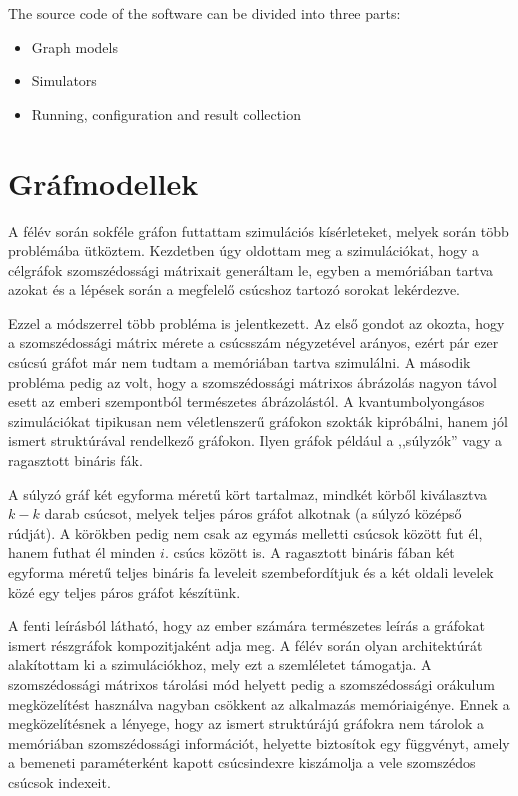 The source code of the software can be divided into three parts:

\begin{itemize}
    \item Graph models
    \item Simulators
    \item Running, configuration and result collection
\end{itemize}





\section{Gráfmodellek}

A félév során sokféle gráfon futtattam szimulációs kísérleteket, melyek során több problémába ütköztem. Kezdetben úgy oldottam meg a szimulációkat, hogy a célgráfok szomszédossági mátrixait generáltam le, egyben a memóriában tartva azokat és a lépések során a megfelelő csúcshoz tartozó sorokat lekérdezve.

Ezzel a módszerrel több probléma is jelentkezett. Az első gondot az okozta, hogy a szomszédossági mátrix mérete a csúcsszám négyzetével arányos, ezért pár ezer csúcsú gráfot már nem tudtam a memóriában tartva szimulálni. A második probléma pedig az volt, hogy a szomszédossági mátrixos ábrázolás nagyon távol esett az emberi szempontból természetes ábrázolástól. A kvantumbolyongásos szimulációkat tipikusan nem véletlenszerű gráfokon szokták kipróbálni, hanem jól ismert struktúrával rendelkező gráfokon. Ilyen gráfok például a ,,súlyzók''
vagy a ragasztott bináris fák.

A súlyzó gráf két egyforma méretű kört tartalmaz, mindkét körből kiválasztva $k - k$ darab csúcsot, melyek teljes páros gráfot alkotnak (a súlyzó középső rúdját). A körökben pedig nem csak az egymás melletti csúcsok között fut él, hanem futhat él minden $i.$ csúcs között is. A ragasztott bináris fában két egyforma méretű teljes bináris fa leveleit szembefordítjuk és a két oldali levelek közé egy teljes páros gráfot készítünk.

A fenti leírásból látható, hogy az ember számára természetes leírás a gráfokat ismert részgráfok kompozitjaként adja meg. A félév során olyan architektúrát alakítottam ki a szimulációkhoz, mely ezt a szemléletet támogatja. A szomszédossági mátrixos tárolási mód helyett pedig a szomszédossági orákulum megközelítést használva nagyban csökkent az alkalmazás memóriaigénye. Ennek a megközelítésnek a lényege, hogy az ismert struktúrájú gráfokra nem tárolok a memóriában szomszédossági információt, helyette biztosítok egy függvényt, amely a bemeneti paraméterként kapott csúcsindexre kiszámolja a vele szomszédos csúcsok indexeit.

